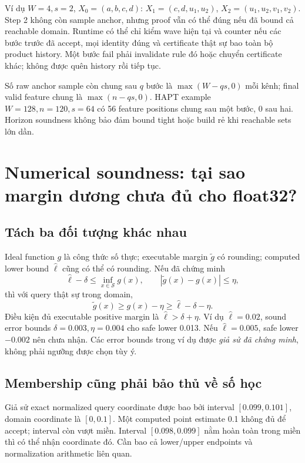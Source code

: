 \documentclass[11pt,a4paper]{article}
\newcommand{\Sset}{\mathcal S}
\theoremstyle{definition}
\begin{document}
Ví dụ $W=4,s=2$, $X_0=(a,b,c,d)$:
$X_1=(c,d,u_1,u_2)$, $X_2=(u_1,u_2,v_1,v_2)$. Step 2 không còn sample
anchor, nhưng proof vẫn có thể đúng nếu đã bound cả reachable domain.
Runtime có thể chỉ kiểm wave hiện tại và counter nếu các bước trước đã
accept, mọi identity đúng và certificate thật sự bao toàn bộ product
history. Một bước fail phải invalidate rule đó hoặc chuyển certificate
khác; không được quên history rồi tiếp tục.

Số raw anchor sample còn chung sau $q$ bước là
$\max(W-qs,0)$ mỗi kênh; final valid feature chung là
$\max(n-qs,0)$. HAPT example $W=128,n=120,s=64$ có 56 feature positions
chung sau một bước, 0 sau hai. Horizon soundness không bảo đảm bound tight
hoặc build rẻ khi reachable sets lớn dần.

\section{Numerical soundness: tại sao margin dương chưa đủ cho float32?}
\subsection{Tách ba đối tượng khác nhau}
Ideal function $g$ là công thức số thực; executable margin $\widetilde g$
có rounding; computed lower bound $\widehat\ell$ cũng có thể có rounding.
Nếu đã chứng minh
\begin{equation}
\widehat\ell-\delta\le\inf_{x\in\Sset}g(x),\qquad
|\widetilde g(x)-g(x)|\le\eta,
\end{equation}
thì với query thật sự trong domain,
\begin{equation}
\widetilde g(x)\ge g(x)-\eta
\ge\widehat\ell-\delta-\eta.
\end{equation}
Điều kiện đủ executable positive margin là
$\widehat\ell>\delta+\eta$. Ví dụ $\widehat\ell=0.02$, sound error bounds
$\delta=0.003,\eta=0.004$ cho safe lower 0.013. Nếu
$\widehat\ell=0.005$, safe lower $-0.002$ nên chưa nhận.
Các error bounds trong ví dụ được \emph{giả sử đã chứng minh}, không phải
ngưỡng được chọn tùy ý.

\subsection{Membership cũng phải bảo thủ về số học}
Giả sử exact normalized query coordinate được bao bởi interval
$[0.099,0.101]$, domain coordinate là $[0,0.1]$. Một computed point estimate
0.1 không đủ để accept; interval còn vượt miền. Interval
$[0.098,0.099]$ nằm hoàn toàn trong miền thì có thể nhận coordinate đó.
Cần bao cả lower/upper endpoints và normalization arithmetic liên quan.
\end{document}
